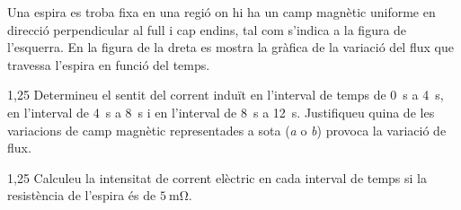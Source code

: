 Una espira es troba fixa en una regió on hi ha un camp magnètic uniforme en direcció perpendicular al full i cap endins, tal com s'indica a la figura de l'esquerra. En la figura de la dreta es mostra la gràfica de la variació del flux que travessa l'espira en funció del temps.


\begin{apartat}{1,25}
Determineu el sentit del corrent induït en l'interval de temps de 0~s a 4~s, en l'interval de 4~s a 8~s i en l'interval de 8~s a 12~s. Justifiqueu quina de les variacions de camp magnètic representades a sota (\textit{a} o \textit{b}) provoca la variació de flux.
\end{apartat}


\begin{apartat}{1,25}
Calculeu la intensitat de corrent elèctric en cada interval de temps si la resistència de l'espira és de $5\ \mathrm{m\Omega}$.
\end{apartat}

